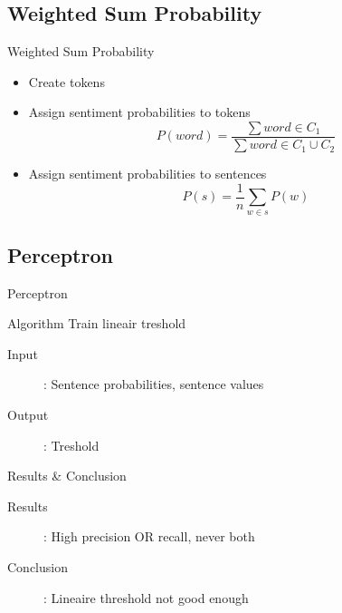 \documentclass{beamer}
\begin{document}
\subsection{Weighted Sum Probability}
\begin{frame}{Weighted Sum Probability}
\begin{itemize}
\item Create tokens
\item Assign sentiment probabilities to tokens
\begin{equation}
P(word) = \frac{ \sum word \in C_1}{\sum word \in C_1\cup C_2}
\end{equation}
\item Assign sentiment probabilities to sentences
\begin{equation}
P(s) = \frac{1}{n} \sum_{w \in s} P(w)
\end{equation}
\end{itemize}
\end{frame}

\subsection{Perceptron}
\begin{frame}{Perceptron}
\begin{block}{Algorithm}
Train lineair treshold
\end{block}
\begin{description}
\item[Input]: Sentence probabilities, sentence values
\item[Output]: Treshold
\end{description}
\end{frame}
\begin{frame}{Results \& Conclusion}
\begin{description}
\item[Results]: High precision OR recall, never both
\item[Conclusion]: Lineaire threshold not good enough
\end{description}
\end{frame}
\end{document}
